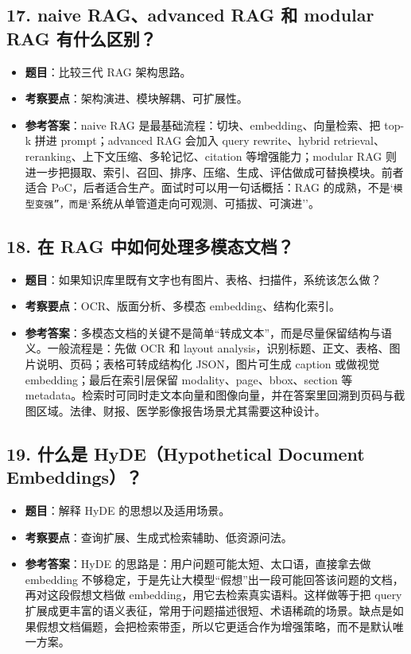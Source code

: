 \subsection{17. naive RAG、advanced RAG 和 modular RAG 有什么区别？}
\begin{itemize}[leftmargin=2em]
\item \textbf{题目}：比较三代 RAG 架构思路。
\item \textbf{考察要点}：架构演进、模块解耦、可扩展性。
\item \textbf{参考答案}：naive RAG 是最基础流程：切块、embedding、向量检索、把 top-k 拼进 prompt；advanced RAG 会加入 query rewrite、hybrid retrieval、reranking、上下文压缩、多轮记忆、citation 等增强能力；modular RAG 则进一步把摄取、索引、召回、排序、压缩、生成、评估做成可替换模块。前者适合 PoC，后者适合生产。面试时可以用一句话概括：RAG 的成熟，不是`\texttt{模型变强''，而是}`系统从单管道走向可观测、可插拔、可演进''。
\end{itemize}

\subsection{18. 在 RAG 中如何处理多模态文档？}
\begin{itemize}[leftmargin=2em]
\item \textbf{题目}：如果知识库里既有文字也有图片、表格、扫描件，系统该怎么做？
\item \textbf{考察要点}：OCR、版面分析、多模态 embedding、结构化索引。
\item \textbf{参考答案}：多模态文档的关键不是简单``转成文本''，而是尽量保留结构与语义。一般流程是：先做 OCR 和 layout analysis，识别标题、正文、表格、图片说明、页码；表格可转成结构化 JSON，图片可生成 caption 或做视觉 embedding；最后在索引层保留 modality、page、bbox、section 等 metadata。检索时可同时走文本向量和图像向量，并在答案里回溯到页码与截图区域。法律、财报、医学影像报告场景尤其需要这种设计。
\end{itemize}

\subsection{19. 什么是 HyDE（Hypothetical Document Embeddings）？}
\begin{itemize}[leftmargin=2em]
\item \textbf{题目}：解释 HyDE 的思想以及适用场景。
\item \textbf{考察要点}：查询扩展、生成式检索辅助、低资源问法。
\item \textbf{参考答案}：HyDE 的思路是：用户问题可能太短、太口语，直接拿去做 embedding 不够稳定，于是先让大模型``假想''出一段可能回答该问题的文档，再对这段假想文档做 embedding，用它去检索真实语料。这样做等于把 query 扩展成更丰富的语义表征，常用于问题描述很短、术语稀疏的场景。缺点是如果假想文档偏题，会把检索带歪，所以它更适合作为增强策略，而不是默认唯一方案。
\end{itemize}

